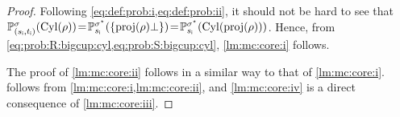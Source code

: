 \begin{proof}
  Following \cref{eq:def:prob:i,eq:def:prob:ii}, it should not be hard
  to see that
  $\mathbb{P}^{\sigma}_{({s_{\textsf{i}}},{t_{\textsf{i}}})}(\mathrm{Cyl}(\rho)) \!=\!
  \mathbb{P}^{\sigma^\star}_{{s_{\textsf{i}}}}(\{\mathrm{proj}(\rho)\bot\}) \!=\!
  \mathbb{P}^{\sigma^\star}_{{s_{\textsf{i}}}}(\mathrm{Cyl}(\mathrm{proj}(\rho)))$. 
  Hence, from \cref{eq:prob:R:bigcup:cyl,eq:prob:S:bigcup:cyl},
  \cref{lm:mc:core:i} follows.



  
  The proof of \cref{lm:mc:core:ii} follows in a similar way to that
  of \cref{lm:mc:core:i}. 
   follows from
  \cref{lm:mc:core:i,lm:mc:core:ii}, and \cref{lm:mc:core:iv} is a
  direct consequence of \cref{lm:mc:core:iii}.  
\end{proof}

